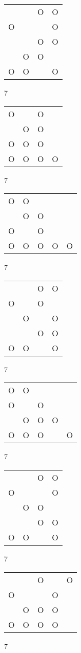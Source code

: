 \begin{tabular}{|m{0.2cm}m{0.2cm}m{0.2cm}m{0.2cm}|}\hline
 & &O&O\\
O& & &O\\
 & &O&O\\
 &O&O& \\
O&O& &O\\
\hline\end{tabular}7
\begin{tabular}{|m{0.2cm}m{0.2cm}m{0.2cm}m{0.2cm}|}\hline
O& &O& \\
 &O&O& \\
O&O&O& \\
O&O&O&O\\
\hline\end{tabular}7
\begin{tabular}{|m{0.2cm}m{0.2cm}m{0.2cm}m{0.2cm}m{0.2cm}|}\hline
O&O& & & \\
 &O&O& & \\
O& &O& & \\
O&O&O&O&O\\
\hline\end{tabular}7
\begin{tabular}{|m{0.2cm}m{0.2cm}m{0.2cm}m{0.2cm}|}\hline
 & &O&O\\
O& &O& \\
 &O& &O\\
 & &O&O\\
O&O& &O\\
\hline\end{tabular}7
\begin{tabular}{|m{0.2cm}m{0.2cm}m{0.2cm}m{0.2cm}m{0.2cm}|}\hline
O&O& & & \\
O& &O& & \\
 &O&O&O& \\
O&O&O& &O\\
\hline\end{tabular}7
\begin{tabular}{|m{0.2cm}m{0.2cm}m{0.2cm}m{0.2cm}|}\hline
 & &O&O\\
O& & &O\\
 &O&O& \\
 & &O&O\\
O&O& &O\\
\hline\end{tabular}7
\begin{tabular}{|m{0.2cm}m{0.2cm}m{0.2cm}m{0.2cm}m{0.2cm}|}\hline
 & &O& &O\\
O& & &O& \\
 &O&O&O& \\
O&O&O&O& \\
\hline\end{tabular}7
